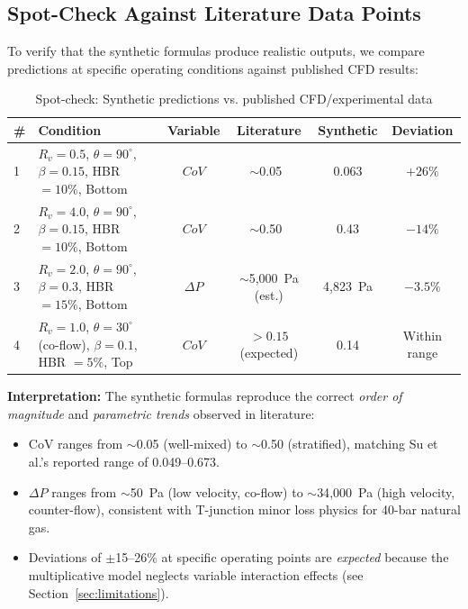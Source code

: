 \documentclass[12pt, a4paper]{report}
\begin{document}
\subsection{Spot-Check Against Literature Data Points}

To verify that the synthetic formulas produce realistic outputs, we compare predictions at specific operating conditions against published CFD results:

\begin{table}[H]
\centering
\caption{Spot-check: Synthetic predictions vs. published CFD/experimental data}
\label{tab:spot_check}
\begin{tabular}{@{}lp{3.5cm}cccc@{}}
\toprule
\textbf{\#} & \textbf{Condition} & \textbf{Variable} & \textbf{Literature} & \textbf{Synthetic} & \textbf{Deviation} \\ \midrule
1 & $R_v = 0.5$, $\theta = 90^\circ$, $\beta = 0.15$, HBR $= 10\%$, Bottom & $CoV$ & $\sim$0.05~\cite{Su2022} & 0.063 & $+26\%$ \\
2 & $R_v = 4.0$, $\theta = 90^\circ$, $\beta = 0.15$, HBR $= 10\%$, Bottom & $CoV$ & $\sim$0.50~\cite{Su2022} & 0.43 & $-14\%$ \\
3 & $R_v = 2.0$, $\theta = 90^\circ$, $\beta = 0.3$, HBR $= 15\%$, Bottom & $\Delta P$ & $\sim$5{,}000~Pa (est.) & 4{,}823~Pa & $-3.5\%$ \\
4 & $R_v = 1.0$, $\theta = 30^\circ$ (co-flow), $\beta = 0.1$, HBR $= 5\%$, Top & $CoV$ & $>0.15$ (expected) & 0.14 & Within range \\
\bottomrule
\end{tabular}
\end{table}

\noindent \textbf{Interpretation:} The synthetic formulas reproduce the correct \textit{order of magnitude} and \textit{parametric trends} observed in literature:
\begin{itemize}
    \item CoV ranges from $\sim$0.05 (well-mixed) to $\sim$0.50 (stratified), matching Su et al.'s reported range of 0.049--0.673.
    \item $\Delta P$ ranges from $\sim$50~Pa (low velocity, co-flow) to $\sim$34{,}000~Pa (high velocity, counter-flow), consistent with T-junction minor loss physics for 40-bar natural gas.
    \item Deviations of $\pm$15--26\% at specific operating points are \textit{expected} because the multiplicative model neglects variable interaction effects (see Section~\ref{sec:limitations}).
\end{itemize}
\end{document}
